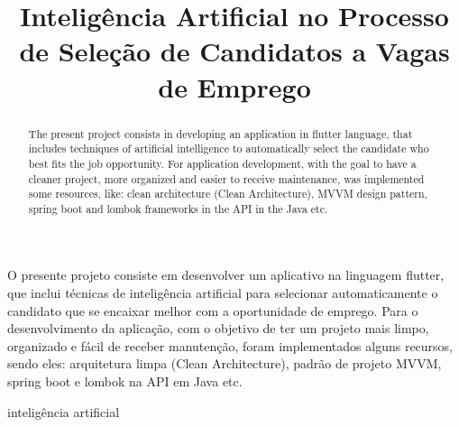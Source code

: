 \documentclass[conference]{IEEEtran}
\begin{document}
\title{Inteligência Artificial no Processo de Seleção de Candidatos a Vagas de Emprego\\

}



\author{
\and
{}
\and
{}
}

\maketitle

\begin{resumo}
O presente projeto consiste em desenvolver um aplicativo na linguagem flutter, que inclui técnicas de inteligência artificial para selecionar automaticamente o candidato que se encaixar melhor com a oportunidade de emprego. Para o desenvolvimento da aplicação, com o objetivo de ter um projeto mais limpo, organizado e fácil de receber manutenção, foram implementados alguns recursos, sendo eles: arquitetura limpa (Clean Architecture), padrão de projeto MVVM, spring boot e lombok na API em Java etc.
\end{resumo}

\begin{IEEEpalavrachave}
inteligência artificial
\end{IEEEpalavrachave}

\begin{abstract}
The present project consists in developing an application in flutter language, that includes techniques of artificial intelligence to automatically select the candidate who best fits the job opportunity. For application development, with the goal to have a cleaner project, more organized and easier to receive maintenance, was implemented some resources, like: clean architecture (Clean Architecture), MVVM design pattern, spring boot and lombok frameworks in the API in the Java etc.
\end{abstract}
\end{document}

